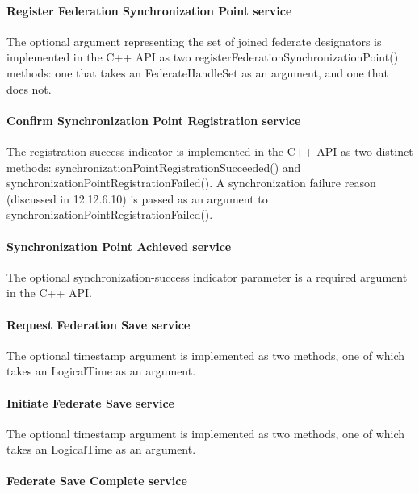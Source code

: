 \begin{compactstdpage}
    \paragraph{Register Federation Synchronization Point service}

    The optional argument representing the set of joined federate designators is implemented in the C++ API as two registerFederationSynchronizationPoint() methods: one that takes an FederateHandleSet as an argument, and one that does not.

    \paragraph{Confirm Synchronization Point Registration \rtiinitiated{} service}

    The registration-success indicator is implemented in the C++ API as two distinct methods: synchronizationPointRegistrationSucceeded()               and synchronizationPointRegistrationFailed(). A synchronization failure reason (discussed in 12.12.6.10) is passed as an argument to synchronizationPointRegistrationFailed().

    \paragraph{Synchronization Point Achieved service}

    The optional synchronization-success indicator parameter is a required argument in the C++ API.

    \paragraph{Request Federation Save service}

    The optional timestamp argument is implemented as two methods, one of which takes an LogicalTime as an argument.

    \paragraph{Initiate Federate Save \rtiinitiated{} service}

    The optional timestamp argument is implemented as two methods, one of which takes an LogicalTime as an argument.

    \paragraph{Federate Save Complete service}


\end{compactstdpage}
